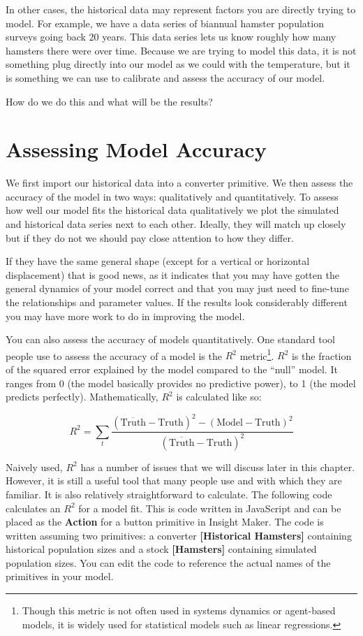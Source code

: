 \documentclass[]{memoir}
\newcommand{\p}[1]{\textbf{{[}#1{]}}}
\renewcommand{\a}[1]{\textbf{#1}}
\begin{document}
In other cases, the historical data may represent factors you are
directly trying to model. For example, we have a data series of biannual
hamster population surveys going back 20 years. This data series lets us
know roughly how many hamsters there were over time. Because we are
trying to model this data, it is not something plug directly into our
model as we could with the temperature, but it is something we can use
to calibrate and assess the accuracy of our model.

How do we do this and what will be the results?

\section{Assessing Model Accuracy}

We first import our historical data into a converter primitive. We then
assess the accuracy of the model in two ways: qualitatively and
quantitatively. To assess how well our model fits the historical data
qualitatively we plot the simulated and historical data series next to
each other. Ideally, they will match up closely but if they do not we
should pay close attention to how they differ.

If they have the same general shape (except for a vertical or horizontal
displacement) that is good news, as it indicates that you may have
gotten the general dynamics of your model correct and that you may just
need to fine-tune the relationships and parameter values. If the results
look considerably different you may have more work to do in improving
the model.

You can also assess the accuracy of models quantitatively. One standard
tool people use to assess the accuracy of a model is the $R^2$
metric\footnote{Though this metric is not often used in systems dynamics
  or agent-based models, it is widely used for statistical models such
  as linear regressions.}. $R^2$ is the fraction of the squared error
explained by the model compared to the ``null'' model. It ranges from 0
(the model basically provides no predictive power), to 1 (the model
predicts perfectly). Mathematically, $R^2$ is calculated like so:

\[ R^2 = \sum_{t} \frac{ (\overline{\text{Truth}}-\text{Truth})^2 - (\text{Model} - \text{Truth})^2}{(\overline{\text{Truth}} - \text{Truth})^2} \]

Naively used, $R^2$ has a number of issues that we will discuss later in
this chapter. However, it is still a useful tool that many people use
and with which they are familiar. It is also relatively straightforward
to calculate. The following code calculates an $R^2$ for a model fit.
This is code written in JavaScript and can be placed as the \a{Action}
for a button primitive in Insight Maker. The code is written assuming
two primitives: a converter \p{Historical Hamsters} containing
historical population sizes and a stock \p{Hamsters} containing
simulated population sizes. You can edit the code to reference the
actual names of the primitives in your model.
\end{document}
